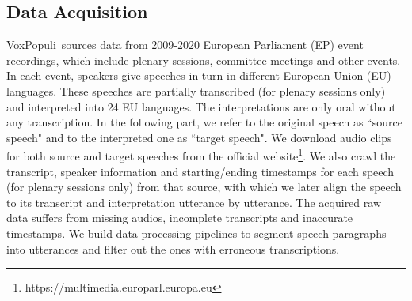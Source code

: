\documentclass[11pt,a4paper]{article}
\newcommand{\vp}{VoxPopuli}
\begin{document}
\subsection{Data Acquisition}
\vp~sources data from 2009-2020 European Parliament (EP) event recordings, which include plenary sessions, committee meetings and other events. In each event, speakers give speeches in turn in different European Union (EU) languages. These speeches are partially transcribed (for plenary sessions only)
and interpreted into 24 EU languages. The interpretations are only oral without any transcription. In the following part, we refer to the original speech as ``source speech" and to the interpreted one as ``target speech".
We download audio clips for both source and target speeches from the official website\footnote{https://multimedia.europarl.europa.eu}. We also crawl the transcript, speaker information and starting/ending timestamps for each speech (for plenary sessions only) from that source, with which we later align the speech to its transcript and interpretation utterance by utterance. The acquired raw data suffers from missing audios, incomplete transcripts and inaccurate timestamps. We build data processing pipelines to segment speech paragraphs into utterances and filter out the ones with erroneous transcriptions.
\end{document}
